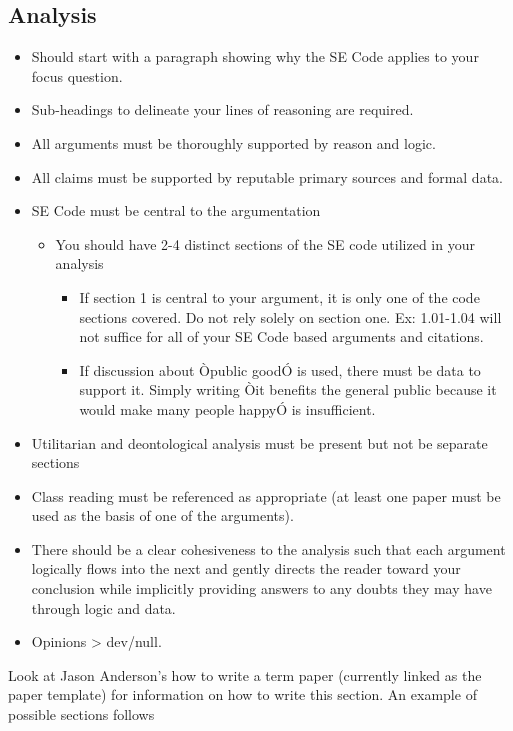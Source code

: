 \documentclass[11pt]{article}
\begin{document}
\begin{multicols}{2}
\section{Analysis}
\begin{itemize}
   \item Should start with a paragraph showing why the SE Code applies to your focus
question.
   \item Sub-headings to delineate your lines of reasoning are required. 
   \item All arguments must be thoroughly supported by reason and logic. 
   \item All claims must be supported by reputable primary sources and formal data. 
   \item SE Code must be central to the argumentation
   \begin{itemize}
      \item You should have 2-4 distinct sections of the SE code utilized in your analysis
      \begin{itemize}
         \item If section 1 is central to your argument, it is only one of the code sections covered. Do not rely solely on section one. Ex: 1.01-1.04 will not suffice for all of your SE Code based arguments and citations. 
         \item If discussion about Òpublic goodÓ is used, there must be data to support it. Simply writing Òit benefits the general public because it would make many people happyÓ is insufficient.
      \end{itemize}
   \end{itemize}     
   \item Utilitarian and deontological analysis must be present but not be separate sections 
   \item Class reading must be referenced as appropriate (at least one paper must be used as the basis of one of the arguments). 
   \item There should be a clear cohesiveness to the analysis such that each argument logically flows into the next and gently directs the reader toward your conclusion while implicitly providing answers to any doubts they may have through logic and data.
   \item Opinions > dev/null. \cite{handout}  
\end{itemize}

Look at Jason Anderson's how to write a term paper (currently linked as the paper template) for information on how to write this section.  An example of possible sections follows

\end{multicols}
\end{document}
